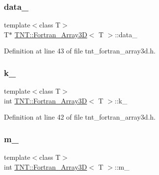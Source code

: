 \subsubsection{\texorpdfstring{data\+\_\+}{data\_}}
{\footnotesize\ttfamily template$<$class T$>$ \\
T$\ast$ \hyperlink{classTNT_1_1Fortran__Array3D}{T\+N\+T\+::\+Fortran\+\_\+\+Array3D}$<$ T $>$\+::data\+\_\+\hspace{0.3cm}{\ttfamily [private]}}



Definition at line 43 of file tnt\+\_\+fortran\+\_\+array3d.\+h.

\mbox{\label{classTNT_1_1Fortran__Array3D_a574ac1622f63254922786524b3dda1fb}} 
\subsubsection{\texorpdfstring{k\+\_\+}{k\_}}
{\footnotesize\ttfamily template$<$class T$>$ \\
int \hyperlink{classTNT_1_1Fortran__Array3D}{T\+N\+T\+::\+Fortran\+\_\+\+Array3D}$<$ T $>$\+::k\+\_\+\hspace{0.3cm}{\ttfamily [private]}}



Definition at line 42 of file tnt\+\_\+fortran\+\_\+array3d.\+h.

\mbox{\label{classTNT_1_1Fortran__Array3D_a3f4db2fe79a5f3c4b05c20c5763428f5}} 
\subsubsection{\texorpdfstring{m\+\_\+}{m\_}}
{\footnotesize\ttfamily template$<$class T$>$ \\
int \hyperlink{classTNT_1_1Fortran__Array3D}{T\+N\+T\+::\+Fortran\+\_\+\+Array3D}$<$ T $>$\+::m\+\_\+\hspace{0.3cm}{\ttfamily [private]}}



